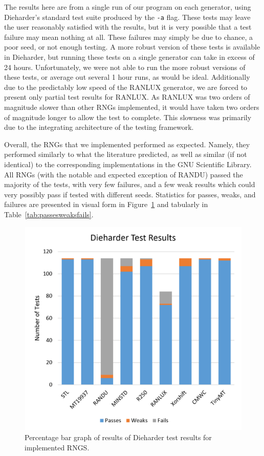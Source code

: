 The results here are from a single run of our program on each generator, using Dieharder's standard test suite produced by the \texttt{-a} flag. These tests may leave the user reasonably satisfied with the results, but it is very possible that a test failure may mean nothing at all. These failures may simply be due to chance, a poor seed, or not enough testing. A more robust version of these tests is available in Dieharder, but running these tests on a single generator can take in excess of 24 hours. Unfortunately, we were not able to run the more robust versions of these tests, or average out several 1 hour runs, as would be ideal. Additionally due to the predictably low speed of the RANLUX generator, we are forced to present only partial test results for RANLUX. As RANLUX was two orders of magnitude slower than other RNGs implemented, it would have taken two orders of magnitude longer to allow the test to complete. This slowness was primarily due to the integrating architecture of the testing framework.

Overall, the RNGs that we implemented performed as expected. Namely, they performed similarly to what the literature predicted, as well as similar (if not identical) to the corresponding implementations in the GNU Scientific Library. All RNGs (with the notable and expected exception of RANDU) passed the majority of the tests, with very few failures, and a few weak results which could very possibly pass if tested with different seeds. Statistics for passes, weaks, and failures are presented in visual form in Figure~\ref{fig:passesweaksfails} and tabularly in Table~\ref{tab:passesweaksfails}.

\begin{figure}[tb]
    \begin{center}
        \includegraphics[width=\linewidth]{figures/passesweaksfails.png}
    \end{center}
    \caption{Percentage bar graph of results of Dieharder test results for implemented RNGS.}
    \label{fig:passesweaksfails}
\end{figure}

